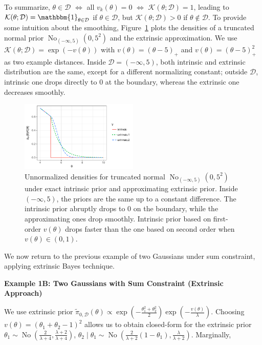 \documentclass[10pt]{article}
\newcommand{\mc}[1]{\mathcal{#1}}
\DeclareMathOperator{\No}{No}
\DeclareMathOperator{\1}{\mathbbm{1}}
\begin{document}
To summarize, $\theta\in \mc D$ $\Leftrightarrow$ all $v_k(\theta)=0$ $\Leftrightarrow$ $\mc K(\theta; \mc D)=1$, leading to $\mc K(\theta; \mc D)=\mathbbm{1}_{\theta\in \mc D}$ if $\theta\in \mc D$, but $\mc K(\theta; \mc D)>0$ if  $\theta\not\in \mc D$. To provide some intuition about the smoothing, Figure~\ref{truncated_normal} plots the densities of a truncated normal prior $\No_{(-\infty,5)}(0,5^2)$ and the extrinsic approximation. We use $\mc K(\theta;\mc D)=\exp(-v(\theta))$ with $v(\theta)=(\theta-5)_+$ and $v(\theta)=(\theta-5)^2_+$ as two example distances. Inside $\mc D=(-\infty,5)$, both intrinsic and extrinsic distribution are the same, except for a different normalizing constant; outside $\mc D$, intrinsic one drops directly to $0$ at the boundary, whereas the extrinsic one decreases smoothly.

\begin{figure}[H]
 \centering
 \includegraphics[width=0.5\textwidth]{density_truncated_normal}
\caption{Unnormalized densities for truncated normal $\No_{(-\infty,5)}(0,5^2)$ under exact intrinsic prior and approximating extrinsic prior. Inside $(-\infty,5)$, the priors are the same up to a constant difference. The intrinsic prior abruptly drops to $0$ on the boundary, while the approximating ones drop smoothly. Intrinsic prior based on first-order $v(\theta)$ drops faster than the one based on second order when $v(\theta)\in (0,1)$.}
\label{truncated_normal}
\end{figure}

We now return to the previous example of two Gaussians under sum constraint, applying extrinsic Bayes technique.

{\bf Example 1B: Two Gaussians with Sum Constraint (Extrinsic Approach)}

We use extrinsic prior $\tilde\pi_{0,\mc D}(\theta) \propto \exp(-\frac{\theta_1^2+\theta_2^2}{2})\exp(-\frac{v(\theta)}{\lambda})$. Choosing $v(\theta)= (\theta_1+\theta_2-1)^2$ allows us to obtain closed-form for the extrinsic prior $\theta_1 \sim \No(\frac{2}{\lambda+4},\frac{\lambda+2}{\lambda+4})$, $\theta_2\mid \theta_1 \sim \No(\frac{2}{\lambda+2}(1-\theta_1),\frac{\lambda}{\lambda+2})$. Marginally, 
\end{document}
